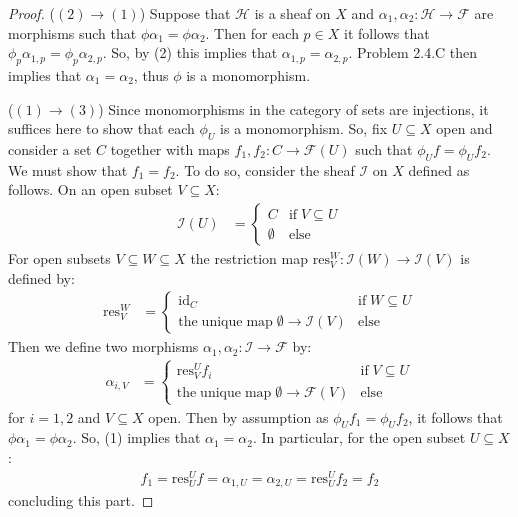 \documentclass{amsart}
\begin{document}
\begin{proof}
        ($(2)\rightarrow(1)$) Suppose that $\mathcal{H}$ is a sheaf on $X$ and $\alpha_1, \alpha_2:\mathcal{H}\rightarrow \mathcal{F}$ are morphisms such that $\phi\alpha_1=\phi\alpha_2$. Then for each $p\in X$ it follows that $\phi_p\alpha_{1, p}=\phi_p\alpha_{2, p}$. So, by (2) this implies that $\alpha_{1, p}=\alpha_{2,p}$. Problem 2.4.C then implies that $\alpha_1=\alpha_2$, thus $\phi$ is a monomorphism. 

    \vspace{0.1in}

    ($(1)\rightarrow(3)$) Since monomorphisms in the category of sets are injections, it suffices here to show that each $\phi_U$ is a monomorphism. So, fix $U\subseteq X$ open and consider a set $C$ together with maps $f_1, f_2:C\rightarrow\mathcal{F}(U)$ such that $\phi_Uf=\phi_Uf_2$. We must show that $f_1=f_2$. To do so, consider the sheaf $\mathcal{I}$ on $X$ defined as follows. On an open subset $V\subseteq X$:
    \begin{align*}
        \mathcal{I}(U) &= \begin{cases}
            C & \mathrm{if}\;V\subseteq U \\
            \emptyset & \mathrm{else}
        \end{cases}
    \end{align*}
    For open subsets $V\subseteq W\subseteq X$ the restriction map $\mathrm{res}^W_V:\mathcal{I}(W)\rightarrow\mathcal{I}(V)$ is defined by:
    \begin{align*}
        \mathrm{res}^W_V &= \begin{cases}
            \mathrm{id}_C & \mathrm{if}\; W\subseteq U \\
            \mathrm{the\;unique\;map\;}\emptyset\rightarrow\mathcal{I}(V) & \mathrm{else}
        \end{cases}
    \end{align*}
    Then we define two morphisms $\alpha_1, \alpha_2:\mathcal{I}\rightarrow \mathcal{F}$ by:
    \begin{align*}
        \alpha_{i, V} &= \begin{cases}
            \mathrm{res}^U_Vf_i & \mathrm{if\;}V\subseteq U \\
            \mathrm{the\;unique\;map\;}\emptyset\rightarrow\mathcal{F}(V) & \mathrm{else}
        \end{cases}
    \end{align*}
    for $i=1, 2$ and $V\subseteq X$ open. Then by assumption as $\phi_Uf_1=\phi_Uf_2$, it follows that $\phi\alpha_1=\phi\alpha_2$. So, (1) implies that $\alpha_1=\alpha_2$. In particular, for the open subset $U\subseteq X$:
    \begin{align*}
        f_1 = \mathrm{res}^U_Uf = \alpha_{1, U} = \alpha_{2, U} = \mathrm{res}^U_Uf_2 = f_2
    \end{align*}
    concluding this part. 


\end{proof}
\end{document}
